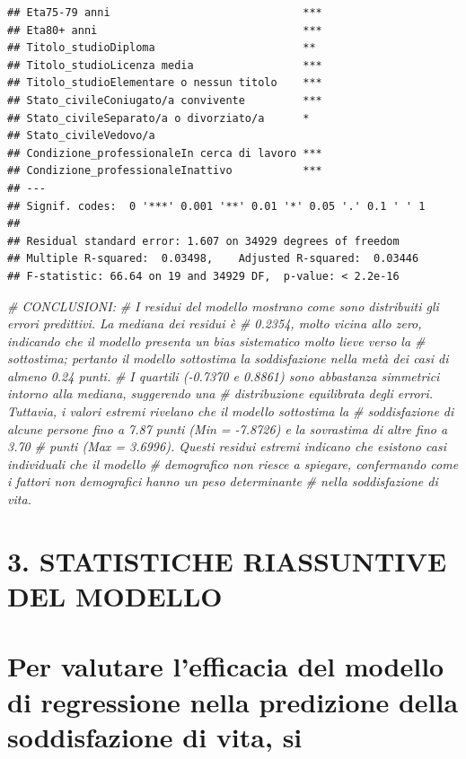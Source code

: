 \documentclass[
]{article}
\newenvironment{Shaded}{\begin{snugshade}}{\end{snugshade}}
\newcommand{\CommentTok}[1]{\textcolor[rgb]{0.56,0.35,0.01}{\textit{#1}}}
\begin{document}
\begin{verbatim}
## Eta75-79 anni                              ***
## Eta80+ anni                                ***
## Titolo_studioDiploma                       ** 
## Titolo_studioLicenza media                 ***
## Titolo_studioElementare o nessun titolo    ***
## Stato_civileConiugato/a convivente         ***
## Stato_civileSeparato/a o divorziato/a      *  
## Stato_civileVedovo/a                          
## Condizione_professionaleIn cerca di lavoro ***
## Condizione_professionaleInattivo           ***
## ---
## Signif. codes:  0 '***' 0.001 '**' 0.01 '*' 0.05 '.' 0.1 ' ' 1
## 
## Residual standard error: 1.607 on 34929 degrees of freedom
## Multiple R-squared:  0.03498,    Adjusted R-squared:  0.03446 
## F-statistic: 66.64 on 19 and 34929 DF,  p-value: < 2.2e-16
\end{verbatim}

\begin{Shaded}
\begin{Highlighting}[]
\CommentTok{\# CONCLUSIONI:}
\CommentTok{\# I residui del modello mostrano come sono distribuiti gli errori predittivi. La mediana dei residui è }
\CommentTok{\# 0.2354, molto vicina allo zero, indicando che il modello presenta un bias sistematico molto lieve verso la \# sottostima; pertanto il modello sottostima la soddisfazione nella metà dei casi di almeno 0.24 punti.}
\CommentTok{\# I quartili ({-}0.7370 e 0.8861) sono abbastanza simmetrici intorno alla mediana, suggerendo una}
\CommentTok{\# distribuzione equilibrata degli errori. Tuttavia, i valori estremi rivelano che il modello sottostima la}
\CommentTok{\# soddisfazione di alcune persone fino a 7.87 punti (Min = {-}7.8726) e la sovrastima di altre fino a 3.70}
\CommentTok{\# punti (Max = 3.6996). Questi residui estremi indicano che esistono casi individuali che il modello}
\CommentTok{\# demografico non riesce a spiegare, confermando come i fattori non demografici hanno un peso determinante }
\CommentTok{\# nella soddisfazione di vita.}
\end{Highlighting}
\end{Shaded}

\section{3. STATISTICHE RIASSUNTIVE DEL
MODELLO}\label{statistiche-riassuntive-del-modello}

\section{Per valutare l'efficacia del modello di regressione nella
predizione della soddisfazione di vita,
si}\label{per-valutare-lefficacia-del-modello-di-regressione-nella-predizione-della-soddisfazione-di-vita-si}
\end{document}
